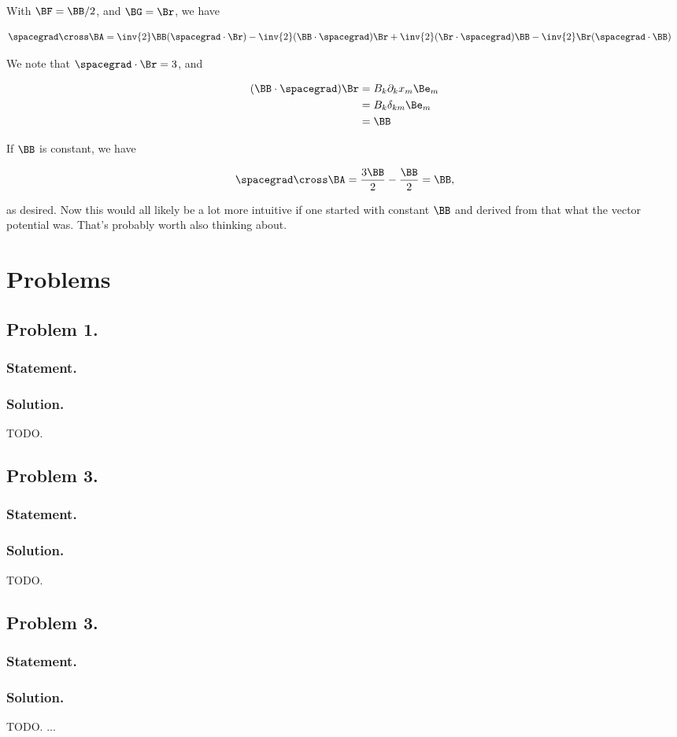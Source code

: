 With $\BF = \BB/2$, and $\BG = \Br$, we have

\begin{align*}
\spacegrad \cross \BA
&=
\inv{2}
\BB (\spacegrad \cdot \Br) -\inv{2}(\BB \cdot \spacegrad) \Br
+\inv{2}(\Br \cdot \spacegrad ) \BB  -\inv{2}\Br (\spacegrad \cdot \BB)
\end{align*}

We note that $\spacegrad \cdot \Br = 3$, and 

\begin{align*}
(\BB \cdot \spacegrad ) \Br 
&=
B_k \partial_k x_m \Be_m \\
&=
B_k \delta_{km} \Be_m \\
&=
\BB
\end{align*}

If $\BB$ is constant, we have

\begin{align}\label{eqn:desaiCh6:7}
\spacegrad \cross \BA = \frac{3\BB}{2} - \frac{\BB}{2} = \BB,
\end{align}

as desired.  Now this would all likely be a lot more intuitive if one started with constant $\BB$ and derived from that what the vector potential was.  That's probably worth also thinking about.

\section{Problems}

\subsection{Problem 1.}
\subsubsection{Statement.}
\subsubsection{Solution.}

TODO.

\subsection{Problem 3.}
\subsubsection{Statement.}
\subsubsection{Solution.}

TODO.

\subsection{Problem 3.}
\subsubsection{Statement.}
\subsubsection{Solution.}

TODO.
...

\EndArticle
